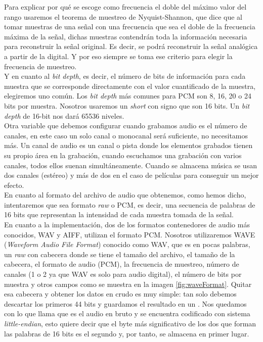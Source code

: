 Para explicar por qué se escoge como frecuencia el doble del máximo valor del rango usaremos el teorema de muestreo de Nyquist-Shannon, que dice que al tomar muestras de una señal con una frecuencia que sea el doble de la frecuencia máxima de la señal, dichas muestras contendrán toda la información necesaria para reconstruir la señal original. Es decir, se podrá reconstruir la señal analógica a partir de la digital. Y por eso siempre se toma ese criterio para elegir la frecuencia de muestreo.\\

Y en cuanto al \emph{bit depth}, es decir, el número de bits de información para cada muestra que se corresponde directamente con el valor cuantificado de la muestra, elegiremos uno común. Los \emph{bit depth} más comunes para PCM son 8, 16, 20 o 24 bits por muestra. Nosotros usaremos un \emph{short} con signo que son 16 bits. Un \emph{bit depth} de 16-bit nos dará 65536 niveles. \\

Otra variable que debemos configurar cuando grabamos audio es el número de canales, en este caso un solo canal o monocanal será suficiente, no necesitamos más. Un canal de audio es un canal o pista donde los elementos grabados tienen su propio área en la grabación, cuando escuchamos una grabación con varios canales, todos ellos suenan simultáneamente. Cuando se almacena música se usan dos canales (estéreo) y más de dos en el caso de películas para conseguir un mejor efecto.\\

En cuanto al formato del archivo de audio que obtenemos, como hemos dicho, intentaremos que sea formato \emph{raw} o PCM, es decir, una secuencia de palabras de 16 bits que representan la intensidad de cada muestra tomada de la señal. \\

En cuanto a la implementación, dos de los formatos contenedores de audio más conocidos, WAV y AIFF, utilizan el formato PCM. Nosotros utilizaremos WAVE (\emph{Waveform Audio File Format}) conocido como WAV, que es en pocas palabras, un \emph{raw} con cabecera donde se tiene el tamaño del archivo, el tamaño de la cabecera, el formato de audio (PCM), la frecuencia de muestreo, número de canales (1 o 2 ya que WAV es solo para audio digital), el número de bits por muestra y otros campos como se muestra en la imagen \ref{fig:waveFormat}. Quitar esa cabecera y obtener los datos en crudo es muy simple: tan solo debemos descartar los primeros 44 bits y guardamos el resultado en un . Nos quedamos con lo que llama  que es el audio en bruto y se encuentra codificado con sistema \emph{little-endian}, esto quiere decir que el byte más significativo de los dos que forman las palabras de 16 bits es el segundo y, por tanto, se almacena en primer lugar.

